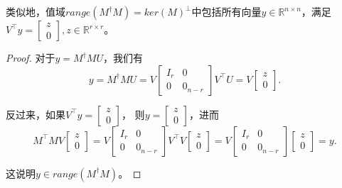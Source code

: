 \begin{subappendices}
类似地，值域$range(M^{\dagger} M) = ker(M)^{\bot}$中包括所有向量$y \in \mathbb{R}^{n \times n}$，满足$V^{\top} y = \begin{bmatrix} z \\ 0 \end{bmatrix}, z \in \mathbb{R}^{r \times r}$。
\begin{proof}
  对于$y = M^{\dagger} M U$，我们有
  \begin{equation*}
    y = M^{\dagger} M U = V \begin{bmatrix}
    I_r & 0 \\ 0 & 0_{n-r}
    \end{bmatrix}
    V^{\top} U = V \begin{bmatrix} z \\ 0 \end{bmatrix}.
  \end{equation*}

  反过来，如果$V^{\top} y = \begin{bmatrix} z \\ 0 \end{bmatrix}$， 则$y = \begin{bmatrix} z \\ 0 \end{bmatrix}$，进而
  \begin{equation*}
    M^{\top} M V \begin{bmatrix} z \\ 0 \end{bmatrix} = V \begin{bmatrix}
    I_r & 0 \\ 0 & 0_{n-r}
  \end{bmatrix} V^{\top} V \begin{bmatrix} z \\ 0 \end{bmatrix} = V \begin{bmatrix}
  I_r & 0 \\ 0 & 0_{n-r}
\end{bmatrix} \begin{bmatrix} z \\ 0 \end{bmatrix} = y.
  \end{equation*}

  这说明$y \in range(M^{\dagger} M)$。
\end{proof}


\end{subappendices}
